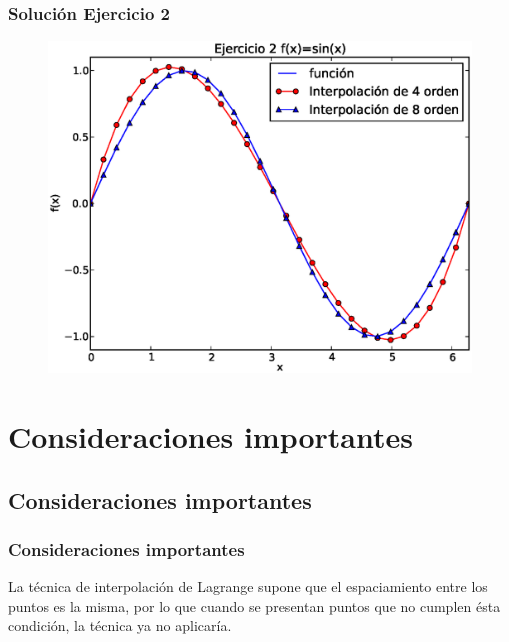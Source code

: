 \begin{frame}
\frametitle{Solución Ejercicio 2}
\begin{figure}
	\centering
	\includegraphics[scale=0.45]{Imagenes/ejercicioTema21_2.eps} 
\end{figure}
\end{frame}
\section{Consideraciones importantes}
\subsection{Consideraciones importantes}
\begin{frame}
\frametitle{Consideraciones importantes}
La técnica de interpolación de Lagrange supone que el espaciamiento entre los puntos es la misma, por lo que cuando se presentan puntos que no cumplen ésta condición, la técnica ya no aplicaría.
\end{frame}
